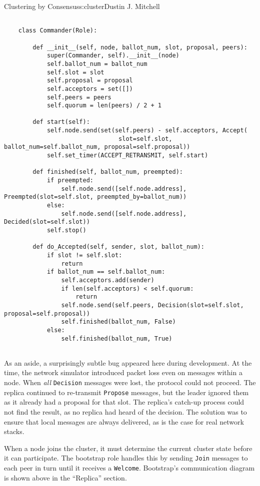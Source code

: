 \begin{aosachapter}{Clustering by Consensus}{s:cluster}{Dustin J. Mitchell}
\begin{verbatim}

    class Commander(Role):
    
        def __init__(self, node, ballot_num, slot, proposal, peers):
            super(Commander, self).__init__(node)
            self.ballot_num = ballot_num
            self.slot = slot
            self.proposal = proposal
            self.acceptors = set([])
            self.peers = peers
            self.quorum = len(peers) / 2 + 1
    
        def start(self):
            self.node.send(set(self.peers) - self.acceptors, Accept(
                                slot=self.slot, ballot_num=self.ballot_num, proposal=self.proposal))
            self.set_timer(ACCEPT_RETRANSMIT, self.start)
    
        def finished(self, ballot_num, preempted):
            if preempted:
                self.node.send([self.node.address], Preempted(slot=self.slot, preempted_by=ballot_num))
            else:
                self.node.send([self.node.address], Decided(slot=self.slot))
            self.stop()
    
        def do_Accepted(self, sender, slot, ballot_num):
            if slot != self.slot:
                return
            if ballot_num == self.ballot_num:
                self.acceptors.add(sender)
                if len(self.acceptors) < self.quorum:
                    return
                self.node.send(self.peers, Decision(slot=self.slot, proposal=self.proposal))
                self.finished(ballot_num, False)
            else:
                self.finished(ballot_num, True)
    
\end{verbatim}

As an aside, a surprisingly subtle bug appeared here during development.
At the time, the network simulator introduced packet loss even on
messages within a node. When \emph{all} \texttt{Decision} messages were
lost, the protocol could not proceed. The replica continued to
re-transmit \texttt{Propose} messages, but the leader ignored them as it
already had a proposal for that slot. The replica's catch-up process
could not find the result, as no replica had heard of the decision. The
solution was to ensure that local messages are always delivered, as is
the case for real network stacks.

\label{bootstrap}

When a node joins the cluster, it must determine the current cluster
state before it can participate. The bootstrap role handles this by
sending \texttt{Join} messages to each peer in turn until it receives a
\texttt{Welcome}. Bootstrap's communication diagram is shown above in
the ``Replica'' section.


\end{aosachapter}
